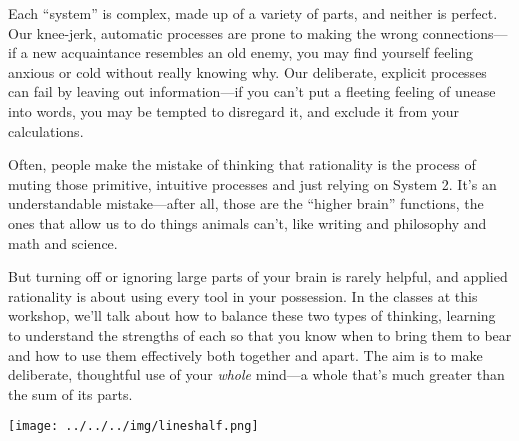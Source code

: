 	 Each ``system'' is complex, made up of a variety of parts, and neither is perfect.  Our knee-jerk, automatic processes are prone to making the wrong connections---if a new acquaintance resembles an old enemy, you may find yourself feeling anxious or cold without really knowing why.  Our deliberate, explicit processes can fail by leaving out information---if you can't put a fleeting feeling of unease into words, you may be tempted to disregard it, and exclude it from your calculations.
	 
	 Often, people make the mistake of thinking that rationality is the process of muting those primitive, intuitive processes and just relying on System 2.  It's an understandable mistake---after all, those are the ``higher brain'' functions, the ones that allow us to do things animals can't, like writing and philosophy and math and science.
	 
	 But turning off or ignoring large parts of your brain is rarely helpful, and applied rationality is about using every tool in your possession.  In the classes at this workshop, we'll talk about how to balance these two types of thinking, learning to understand the strengths of each so that you know when to bring them to bear and how to use them effectively both together and apart.  The aim is to make deliberate, thoughtful use of your \emph{whole} mind---a whole that's much greater than the sum of its parts.

\begin{center}
\texttt{[image: ../../../img/lineshalf.png]}
\end{center}